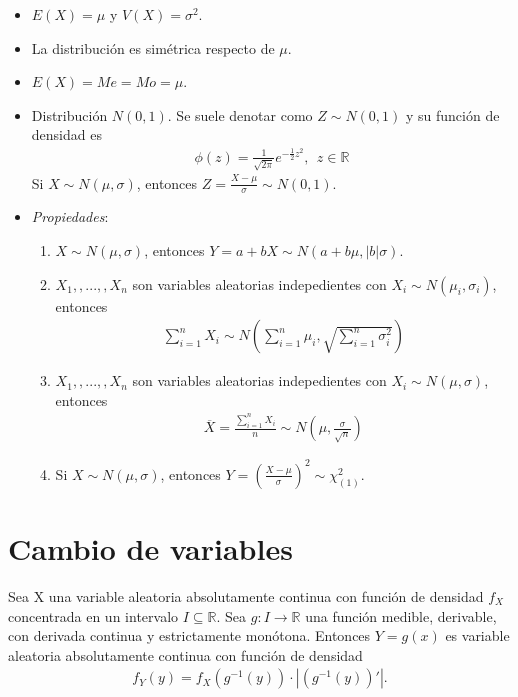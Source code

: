 \begin{itemize}
    \item $E(X) = \mu$ y $V(X) = \sigma^2$.
    \item La distribución es simétrica respecto de $\mu$.
    \item $E(X) = Me = Mo = \mu$.
    \item Distribución $N(0,1)$. Se suele denotar como $Z \sim N(0,1)$ y su función de densidad es
          \begin{align*}
              \phi(z) = \frac{1}{\sqrt{2\pi}}e^{-\frac{1}{2}z^2}, \ \ z \in \mathbb{R}
          \end{align*}
          Si $X \sim N(\mu,\sigma)$, entonces $Z = \frac{X - \mu}{\sigma} \sim N(0,1)$.
    \item \textit{Propiedades}:
          \begin{enumerate}
              \item $X \sim N(\mu,\sigma)$, entonces $Y = a + bX \sim N(a + b\mu, |b|\sigma)$.
              \item $X_1,,...,,X_n$ son variables aleatorias indepedientes con $X_i \sim N(\mu_i,\sigma_i)$, entonces
                    \begin{align*}
                        \sum_{i=1}^{n}{X_i} \sim N\left( \sum_{i=1}^{n}{\mu_i}, \sqrt{\sum_{i=1}^{n}{\sigma_i^2}} \right)
                    \end{align*}
              \item $X_1,,...,,X_n$ son variables aleatorias indepedientes con $X_i \sim N(\mu,\sigma)$, entonces
                    \begin{align*}
                        \overline{X} = \frac{\sum_{i=1}^{n}{X_i}}{n} \sim N\left( \mu, \frac{\sigma}{\sqrt{n}} \right)
                    \end{align*}
              \item Si $X \sim N(\mu,\sigma)$, entonces $Y = \left( \frac{X - \mu}{\sigma}\right)^2 \sim \chi_{(1)}^2$.
          \end{enumerate}
\end{itemize}

\newpage
\section{Cambio de variables}
\begin{teo}
    Sea X una variable aleatoria absolutamente continua con función de densidad $f_X$ concentrada en un intervalo $I \subseteq \mathbb{R}$. Sea $g: I \longrightarrow \mathbb{R}$ una función medible, derivable, con derivada continua y estrictamente monótona. Entonces $Y = g(x)$ es variable aleatoria absolutamente continua con función de densidad
    \begin{align*}
        f_Y(y) = f_X(g^{-1}(y)) \cdot |(g^{-1}(y))'|.
    \end{align*}
\end{teo}

